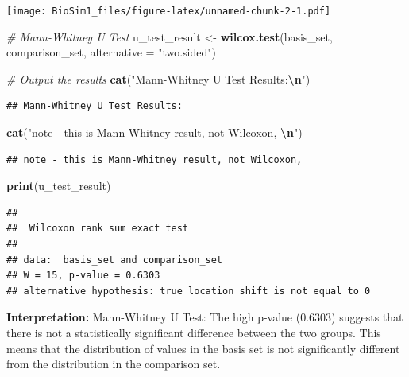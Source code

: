 \documentclass[
  12pt,
  a4paper,
]{article}
\newenvironment{Shaded}{\begin{snugshade}}{\end{snugshade}}
\newcommand{\AttributeTok}[1]{\textcolor[rgb]{0.13,0.29,0.53}{#1}}
\newcommand{\CommentTok}[1]{\textcolor[rgb]{0.56,0.35,0.01}{\textit{#1}}}
\newcommand{\FunctionTok}[1]{\textcolor[rgb]{0.13,0.29,0.53}{\textbf{#1}}}
\newcommand{\NormalTok}[1]{#1}
\newcommand{\OtherTok}[1]{\textcolor[rgb]{0.56,0.35,0.01}{#1}}
\newcommand{\SpecialCharTok}[1]{\textcolor[rgb]{0.81,0.36,0.00}{\textbf{#1}}}
\newcommand{\StringTok}[1]{\textcolor[rgb]{0.31,0.60,0.02}{#1}}
\numberwithin{equation}{section}
\theoremstyle{plain}
\theoremstyle{definition}
\theoremstyle{remark}
\theoremstyle{note}
\begin{document}
\texttt{[image: BioSim1\_files/figure-latex/unnamed-chunk-2-1.pdf]}

\newpage

\begin{Shaded}
\begin{Highlighting}[]
\CommentTok{\# Mann{-}Whitney U Test}
\NormalTok{u\_test\_result }\OtherTok{\textless{}{-}} \FunctionTok{wilcox.test}\NormalTok{(basis\_set, comparison\_set, }\AttributeTok{alternative =} \StringTok{"two.sided"}\NormalTok{)}

\CommentTok{\# Output the results}
\FunctionTok{cat}\NormalTok{(}\StringTok{"Mann{-}Whitney U Test Results:}\SpecialCharTok{\textbackslash{}n}\StringTok{"}\NormalTok{)}
\end{Highlighting}
\end{Shaded}

\begin{verbatim}
## Mann-Whitney U Test Results:
\end{verbatim}

\begin{Shaded}
\begin{Highlighting}[]
\FunctionTok{cat}\NormalTok{(}\StringTok{"note {-} this is Mann{-}Whitney result, not Wilcoxon, }\SpecialCharTok{\textbackslash{}n}\StringTok{"}\NormalTok{)}
\end{Highlighting}
\end{Shaded}

\begin{verbatim}
## note - this is Mann-Whitney result, not Wilcoxon,
\end{verbatim}

\begin{Shaded}
\begin{Highlighting}[]
\FunctionTok{print}\NormalTok{(u\_test\_result)}
\end{Highlighting}
\end{Shaded}

\begin{verbatim}
## 
##  Wilcoxon rank sum exact test
## 
## data:  basis_set and comparison_set
## W = 15, p-value = 0.6303
## alternative hypothesis: true location shift is not equal to 0
\end{verbatim}

\textbf{Interpretation:} Mann-Whitney U Test: The high p-value (0.6303)
suggests that there is not a statistically significant difference
between the two groups. This means that the distribution of values in
the basis set is not significantly different from the distribution in
the comparison set.
\end{document}
